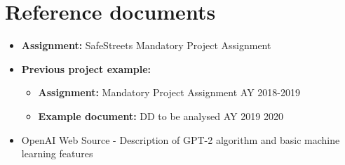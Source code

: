 \section{Reference documents}
\begin{itemize}
  \item \textbf{Assignment:} SafeStreets Mandatory Project Assignment
  \item \textbf{Previous project example:}
  \begin{itemize}
    \item \textbf{Assignment:} Mandatory Project Assignment AY 2018-2019
    \item \textbf{Example document:} DD to be analysed AY 2019 2020
  \end{itemize}
  \item OpenAI Web Source - Description of GPT-2 algorithm and basic machine learning features
\end{itemize}